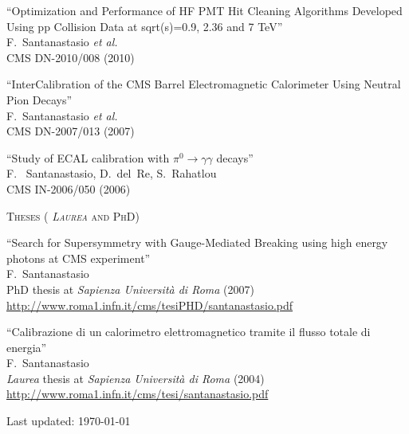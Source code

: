 \documentclass[10pt, a4paper]{article}
\begin{document}
\begin{thebibliography}{599}
``Optimization and Performance of HF PMT Hit Cleaning Algorithms Developed Using pp Collision Data at sqrt(s)=0.9, 2.36 and 7 TeV''
  \\{}F.~Santanastasio {\it et al.}
  \\{}CMS DN-2010/008 (2010)

``InterCalibration of the CMS Barrel Electromagnetic Calorimeter Using Neutral Pion Decays''
   \\{}F.~Santanastasio {\it et al.}
  \\{}CMS DN-2007/013 (2007)

``Study of ECAL calibration with $\pi^0 \rightarrow \gamma \gamma$ decays''
  \\{}F. ~Santanastasio, D.~del~Re, S.~Rahatlou
  \\{}CMS IN-2006/050 (2006)


\vspace{0.1cm} \begin{center} \textsc{Theses ( \textit{Laurea} and PhD)} \end{center} \vspace{0.05cm}

``Search for Supersymmetry with Gauge-Mediated Breaking using high energy photons at CMS experiment''
  \\{}F.~Santanastasio
  \\{}PhD thesis at \textit{Sapienza Universit\`a di Roma} (2007)
 \\{}\href{http://www.roma1.infn.it/cms/tesiPHD/santanastasio.pdf}{http://www.roma1.infn.it/cms/tesiPHD/santanastasio.pdf}

``Calibrazione di un calorimetro elettromagnetico tramite il flusso totale di energia''
  \\{}F.~Santanastasio
  \\{}\textit{Laurea} thesis at \textit{Sapienza Universit\`a di Roma} (2004)
  \\{}\href{http://www.roma1.infn.it/cms/tesi/santanastasio.pdf}{http://www.roma1.infn.it/cms/tesi/santanastasio.pdf}


\end{thebibliography}

\vfill{}
\hrulefill

\begin{center}
{\footnotesize Last updated: \today}
\end{center}
\end{document}

